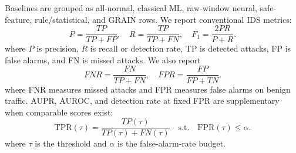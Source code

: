 \documentclass[runningheads]{llncs}
\begin{document}
Baselines are grouped as all-normal, classical ML, raw-window neural, safe-feature, rule/statistical, and GRAIN rows.  We report conventional IDS metrics:
\[
P=\frac{TP}{TP+FP},\quad R=\frac{TP}{TP+FN},\quad F_1=\frac{2PR}{P+R}.
\]
where \(P\) is precision, \(R\) is recall or detection rate, TP is detected attacks, FP is false alarms, and FN is missed attacks.  We also report
\[
FNR=\frac{FN}{TP+FN},\quad FPR=\frac{FP}{FP+TN}.
\]
where FNR measures missed attacks and FPR measures false alarms on benign traffic.  AUPR, AUROC, and detection rate at fixed FPR are supplementary when comparable scores exist:
\[
\mathrm{TPR}(\tau)=\frac{TP(\tau)}{TP(\tau)+FN(\tau)}\quad \mathrm{s.t.}\quad \mathrm{FPR}(\tau)\le \alpha .
\]
where \(\tau\) is the threshold and \(\alpha\) is the false-alarm-rate budget.

\begin{table}[!htbp]
\caption{Dataset and class-balance summary for settings used in the revised evidence package.}\label{tab:data}
\centering\small
{}
\end{table}
\end{document}
